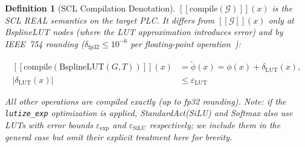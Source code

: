 \documentclass[journal,onecolumn]{IEEEtran}
\newcommand{\llbracket}{[\![}
\newcommand{\rrbracket}{]\!]}
\newtheorem{definition}{Definition}
\begin{document}
\begin{definition}[SCL Compilation Denotation]
\label{def:scl_denotation}
$\llbracket\text{compile}(\mathcal{G})\rrbracket(x)$ is the SCL REAL
semantics on the target PLC. It differs from $\llbracket\mathcal{G}
\rrbracket(x)$ only at BsplineLUT nodes (where the LUT approximation
introduces error) and by IEEE~754 rounding ($\delta_{\text{fp32}} \leq
10^{-6}$ per floating-point operation~\cite{paszke2019pytorch}):

\begin{equation}
\begin{aligned}
\llbracket\text{compile}(\text{BsplineLUT}(G,T))\rrbracket(x) &=
\tilde{\phi}(x) = \phi(x) + \delta_{\text{LUT}}(x), \\
|\delta_{\text{LUT}}(x)| &\leq \varepsilon_{\text{LUT}}
\end{aligned}
\label{eq:lut_error_def}
\end{equation}

All other operations are compiled exactly (up to fp32 rounding).
Note: if the \texttt{lutize\_exp} optimization is applied,
StandardAct(SiLU) and Softmax also use LUTs with error bounds
$\varepsilon_{\text{exp}}$ and $\varepsilon_{\text{SiLU}}$
respectively; we include them in the general case but omit their
explicit treatment here for brevity.
\end{definition}
\end{document}
